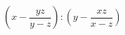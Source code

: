 \begin{ex}[type=expression]
	\begin{condition}
		\( \left( x-\dfrac{yz}{y-z} \right):\left( y-\dfrac{xz}{x-z} \right) \)
	\end{condition}
\end{ex}